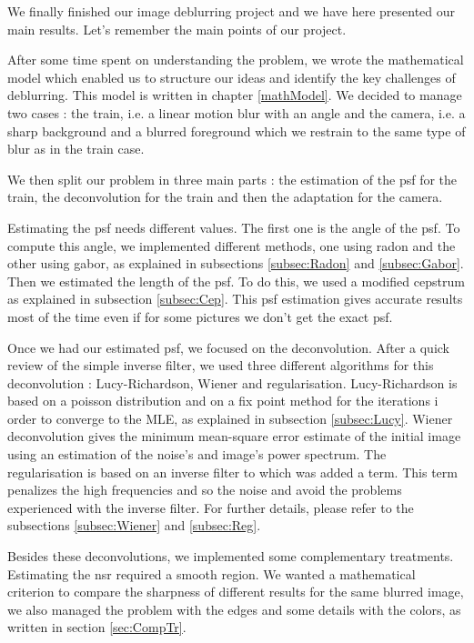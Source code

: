 
We finally finished our image deblurring project and we have here presented our main results. Let's remember the main points of our project. 

After some time spent on understanding the problem, we wrote the mathematical model which enabled us to structure our ideas and identify the key challenges of deblurring. This model is written in chapter \ref{mathModel}. We decided to manage two cases : the train, i.e. a linear motion blur with an angle and the camera, i.e. a sharp background and a blurred foreground which we restrain to the same type of blur as in the train case. 

We then split our problem in three main parts : the estimation of the psf for the train, the deconvolution for the train and then the adaptation for the camera. 

Estimating the psf needs different values. The first one is the angle of the psf. To compute this angle, we implemented different methods, one using radon and the other using gabor, as explained in subsections \ref{subsec:Radon} and \ref{subsec:Gabor}. Then we estimated the length of the psf. To do this, we used a modified cepstrum as explained in subsection \ref{subsec:Cep}. This psf estimation gives accurate results most of the time even if for some pictures we don't get the exact psf. 

Once we had our estimated psf, we focused on the deconvolution. After a quick review of the simple inverse filter, we used three different algorithms for this deconvolution : Lucy-Richardson, Wiener and regularisation. Lucy-Richardson is based on a poisson distribution and on a fix point method for the iterations i order to converge to the MLE, as explained in subsection \ref{subsec:Lucy}. Wiener deconvolution gives the minimum mean-square error estimate of the initial image using an estimation of the noise's and image's power spectrum. The regularisation is based on an inverse filter to which was added a term.  This term penalizes the high frequencies and so the noise and avoid the problems experienced with the inverse filter. For further details, please refer to the subsections \ref{subsec:Wiener} and \ref{subsec:Reg}.

Besides these deconvolutions, we implemented some complementary treatments. Estimating the nsr required a smooth region. We wanted a mathematical criterion to compare the sharpness of different results for the same blurred image, we also managed the problem with the edges and some details with the colors, as written in section \ref{sec:CompTr}.


